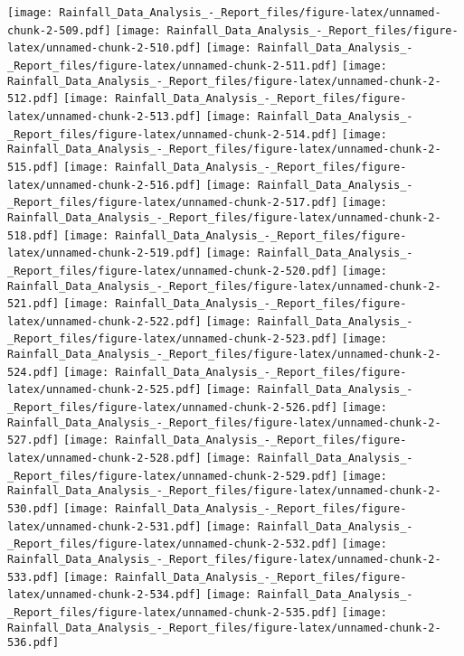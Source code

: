 \documentclass[
]{article}
\begin{document}
\texttt{[image: Rainfall\_Data\_Analysis\_-\_Report\_files/figure-latex/unnamed-chunk-2-509.pdf]}
\texttt{[image: Rainfall\_Data\_Analysis\_-\_Report\_files/figure-latex/unnamed-chunk-2-510.pdf]}
\texttt{[image: Rainfall\_Data\_Analysis\_-\_Report\_files/figure-latex/unnamed-chunk-2-511.pdf]}
\texttt{[image: Rainfall\_Data\_Analysis\_-\_Report\_files/figure-latex/unnamed-chunk-2-512.pdf]}
\texttt{[image: Rainfall\_Data\_Analysis\_-\_Report\_files/figure-latex/unnamed-chunk-2-513.pdf]}
\texttt{[image: Rainfall\_Data\_Analysis\_-\_Report\_files/figure-latex/unnamed-chunk-2-514.pdf]}
\texttt{[image: Rainfall\_Data\_Analysis\_-\_Report\_files/figure-latex/unnamed-chunk-2-515.pdf]}
\texttt{[image: Rainfall\_Data\_Analysis\_-\_Report\_files/figure-latex/unnamed-chunk-2-516.pdf]}
\texttt{[image: Rainfall\_Data\_Analysis\_-\_Report\_files/figure-latex/unnamed-chunk-2-517.pdf]}
\texttt{[image: Rainfall\_Data\_Analysis\_-\_Report\_files/figure-latex/unnamed-chunk-2-518.pdf]}
\texttt{[image: Rainfall\_Data\_Analysis\_-\_Report\_files/figure-latex/unnamed-chunk-2-519.pdf]}
\texttt{[image: Rainfall\_Data\_Analysis\_-\_Report\_files/figure-latex/unnamed-chunk-2-520.pdf]}
\texttt{[image: Rainfall\_Data\_Analysis\_-\_Report\_files/figure-latex/unnamed-chunk-2-521.pdf]}
\texttt{[image: Rainfall\_Data\_Analysis\_-\_Report\_files/figure-latex/unnamed-chunk-2-522.pdf]}
\texttt{[image: Rainfall\_Data\_Analysis\_-\_Report\_files/figure-latex/unnamed-chunk-2-523.pdf]}
\texttt{[image: Rainfall\_Data\_Analysis\_-\_Report\_files/figure-latex/unnamed-chunk-2-524.pdf]}
\texttt{[image: Rainfall\_Data\_Analysis\_-\_Report\_files/figure-latex/unnamed-chunk-2-525.pdf]}
\texttt{[image: Rainfall\_Data\_Analysis\_-\_Report\_files/figure-latex/unnamed-chunk-2-526.pdf]}
\texttt{[image: Rainfall\_Data\_Analysis\_-\_Report\_files/figure-latex/unnamed-chunk-2-527.pdf]}
\texttt{[image: Rainfall\_Data\_Analysis\_-\_Report\_files/figure-latex/unnamed-chunk-2-528.pdf]}
\texttt{[image: Rainfall\_Data\_Analysis\_-\_Report\_files/figure-latex/unnamed-chunk-2-529.pdf]}
\texttt{[image: Rainfall\_Data\_Analysis\_-\_Report\_files/figure-latex/unnamed-chunk-2-530.pdf]}
\texttt{[image: Rainfall\_Data\_Analysis\_-\_Report\_files/figure-latex/unnamed-chunk-2-531.pdf]}
\texttt{[image: Rainfall\_Data\_Analysis\_-\_Report\_files/figure-latex/unnamed-chunk-2-532.pdf]}
\texttt{[image: Rainfall\_Data\_Analysis\_-\_Report\_files/figure-latex/unnamed-chunk-2-533.pdf]}
\texttt{[image: Rainfall\_Data\_Analysis\_-\_Report\_files/figure-latex/unnamed-chunk-2-534.pdf]}
\texttt{[image: Rainfall\_Data\_Analysis\_-\_Report\_files/figure-latex/unnamed-chunk-2-535.pdf]}
\texttt{[image: Rainfall\_Data\_Analysis\_-\_Report\_files/figure-latex/unnamed-chunk-2-536.pdf]}
\end{document}
